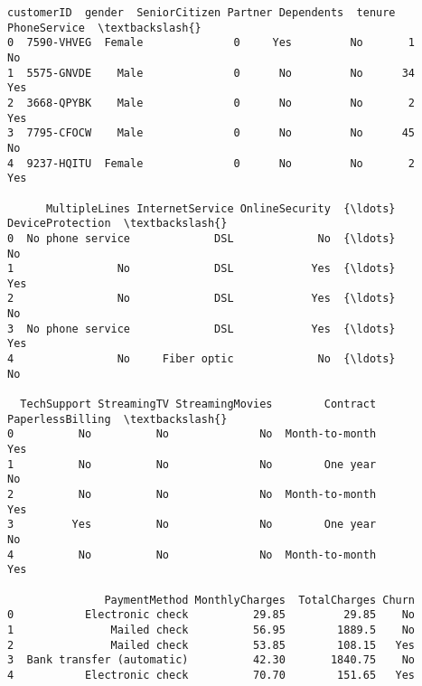 \documentclass[11pt]{article}
\begin{document}
    \begin{Verbatim}[commandchars=\\\{\}]
   customerID  gender  SeniorCitizen Partner Dependents  tenure PhoneService  \textbackslash{}
0  7590-VHVEG  Female              0     Yes         No       1           No
1  5575-GNVDE    Male              0      No         No      34          Yes
2  3668-QPYBK    Male              0      No         No       2          Yes
3  7795-CFOCW    Male              0      No         No      45           No
4  9237-HQITU  Female              0      No         No       2          Yes

      MultipleLines InternetService OnlineSecurity  {\ldots} DeviceProtection  \textbackslash{}
0  No phone service             DSL             No  {\ldots}               No
1                No             DSL            Yes  {\ldots}              Yes
2                No             DSL            Yes  {\ldots}               No
3  No phone service             DSL            Yes  {\ldots}              Yes
4                No     Fiber optic             No  {\ldots}               No

  TechSupport StreamingTV StreamingMovies        Contract PaperlessBilling  \textbackslash{}
0          No          No              No  Month-to-month              Yes
1          No          No              No        One year               No
2          No          No              No  Month-to-month              Yes
3         Yes          No              No        One year               No
4          No          No              No  Month-to-month              Yes

               PaymentMethod MonthlyCharges  TotalCharges Churn
0           Electronic check          29.85         29.85    No
1               Mailed check          56.95        1889.5    No
2               Mailed check          53.85        108.15   Yes
3  Bank transfer (automatic)          42.30       1840.75    No
4           Electronic check          70.70        151.65   Yes


\end{Verbatim}
\end{document}

